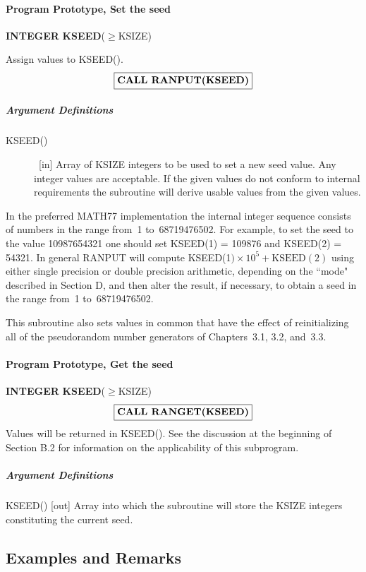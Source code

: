 \documentclass[twoside]{MATH77}
\begin{document}
\paragraph{Program Prototype, Set the seed}

{\bf INTEGER} {\bf KSEED}($\geq $KSIZE)

Assign values to KSEED().
$$
\fbox{{\bf CALL RANPUT(KSEED)}}
$$
\subparagraph{Argument Definitions}

\begin{description}
\item[KSEED()] \ [in] Array of KSIZE integers to be used to set a new seed value. Any
integer values are acceptable. If the given values do not conform to
internal requirements the subroutine will derive usable values from the
given values.
\end{description}

In the preferred MATH77 implementation the internal integer sequence
consists of numbers in the range from~1 to~68719476502. For example, to set
the seed to the value 10987654321 one should set KSEED(1) = 109876 and
KSEED(2) = 54321. In general RANPUT will compute KSEED(1$) \times 10^5 +
\text{KSEED}(2)$ using either single precision or double precision
arithmetic, depending on the ``mode"
described in Section D, and then alter the result, if necessary, to obtain a
seed in the range from~1 to~68719476502.

This subroutine also sets values in common that have the effect of
reinitializing all of the pseudorandom number generators of Chapters~3.1,
3.2, and~3.3.

\paragraph{Program Prototype, Get the seed}

{\bf INTEGER} {\bf KSEED}($\geq $KSIZE)
$$
\fbox{{\bf CALL RANGET(KSEED)}}
$$
Values will be returned in KSEED(). See the discussion at the beginning of
Section B.2 for information on the applicability of this subprogram.

\subparagraph{Argument Definitions}

KSEED() [out] Array into which the subroutine will store the KSIZE integers
constituting the current seed.

\subsection{Examples and Remarks}
\end{document}
